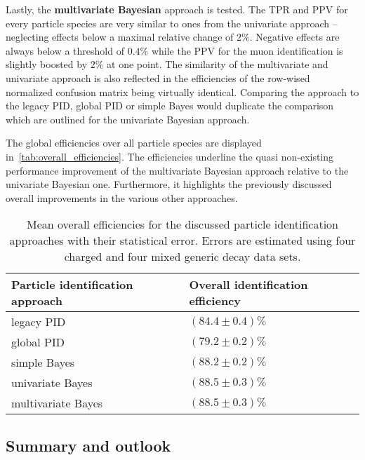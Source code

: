 Lastly, the \textbf{multivariate Bayesian} approach is tested. The TPR and PPV for every particle species are very similar to ones from the univariate approach -- neglecting effects below a maximal relative change of $2 \%$. Negative effects are always below a threshold of $0.4 \%$ while the PPV for the muon identification is slightly boosted by $2 \%$ at one point.
The similarity of the multivariate and univariate approach is also reflected in the efficiencies of the row-wised normalized confusion matrix being virtually identical. Comparing the approach to the legacy PID, global PID or simple Bayes would duplicate the comparison which are outlined for the univariate Bayesian approach.

The global efficiencies over all particle species are displayed in~\autoref{tab:overall_efficiencies}. The efficiencies underline the quasi non-existing performance improvement of the multivariate Bayesian approach relative to the univariate Bayesian one. Furthermore, it highlights the previously discussed overall improvements in the various other approaches.

\begin{table}[ht]
	\centering
	\begin{tabular}{l|l}
		Particle identification approach & Overall identification efficiency \\
		\hline
		legacy PID & $(84.4 \pm 0.4) \%$ \\ %
		global PID & $(79.2 \pm 0.2) \%$ \\ %
		simple Bayes & $(88.2 \pm 0.2) \%$ \\ %
		univariate Bayes & $(88.5 \pm 0.3) \%$ \\ %
		multivariate Bayes & $(88.5 \pm 0.3) \%$ %
	\end{tabular}
	\caption{Mean overall efficiencies for the discussed particle identification approaches with their statistical error. Errors are estimated using four charged and four mixed generic decay data sets.}
	\label{tab:overall_efficiencies}
\end{table}

\subsection{Summary and outlook}
\label{subsc:bayesian_approach_summary}

